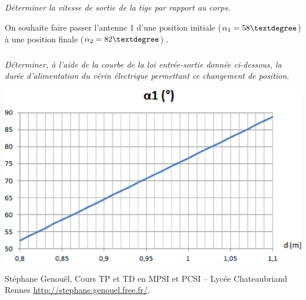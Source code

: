 \documentclass[11pt,oneside]{article}
\begin{document}
\subparagraph{}
\textit{Déterminer la vitesse de sortie de la tige par rapport au corps.}



On souhaite faire passer l’antenne 1 d’une position initiale ($\alpha_1 = 58\textdegree$) à une position finale ($\alpha_2 = 82\textdegree$) .

\subparagraph{}
\textit{Déterminer, à l’aide de la courbe de la loi entrée-sortie donnée ci-dessous, la durée d’alimentation du vérin électrique permettant ce changement de position. }


\begin{center}
\includegraphics[width=.8\textwidth]{png/fig9} 
\end{center}


\begin{thebibliography}{2}
 Stéphane Genouël, Cours TP et TD en MPSI et PCSI -- Lycée Chateaubriand Rennes \url{http://stephane.genouel.free.fr/}.
\end{thebibliography}
\end{document}

